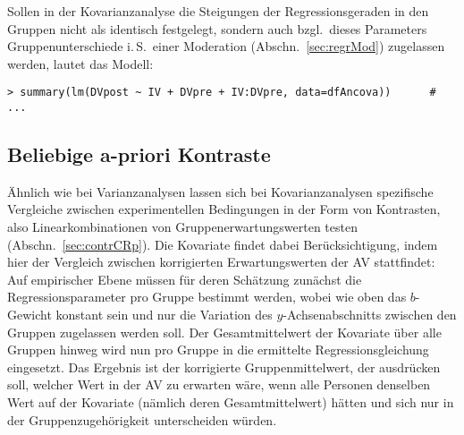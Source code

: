 Sollen in der Kovarianzanalyse die Steigungen der Regressionsgeraden in den Gruppen nicht als identisch festgelegt, sondern auch bzgl.\ dieses Parameters Gruppenunterschiede i.\,S.\ einer Moderation (Abschn.\ \ref{sec:regrMod}) zugelassen werden, lautet das Modell:
\begin{lstlisting}
> summary(lm(DVpost ~ IV + DVpre + IV:DVpre, data=dfAncova))      # ...
\end{lstlisting}

\subsection{Beliebige a-priori Kontraste}

Ähnlich wie bei Varianzanalysen lassen sich bei Kovarianzanalysen spezifische Vergleiche zwischen experimentellen Bedingungen in der Form von Kontrasten, also Linearkombinationen von Gruppenerwartungswerten testen (Abschn.\ \ref{sec:contrCRp}). Die Kovariate findet dabei Berücksichtigung, indem hier der Vergleich zwischen korrigierten Erwartungswerten der AV stattfindet: Auf empirischer Ebene müssen für deren Schätzung zunächst die Regressionsparameter pro Gruppe bestimmt werden, wobei wie oben das $b$-Gewicht konstant sein und nur die Variation des $y$-Achsenabschnitts zwischen den Gruppen zugelassen werden soll. Der Gesamtmittelwert der Kovariate über alle Gruppen hinweg wird nun pro Gruppe in die ermittelte Regressionsgleichung eingesetzt. Das Ergebnis ist der korrigierte Gruppenmittelwert, der ausdrücken soll, welcher Wert in der AV zu erwarten wäre, wenn alle Personen denselben Wert auf der Kovariate (nämlich deren Gesamtmittelwert) hätten und sich nur in der Gruppenzugehörigkeit unterscheiden würden.


